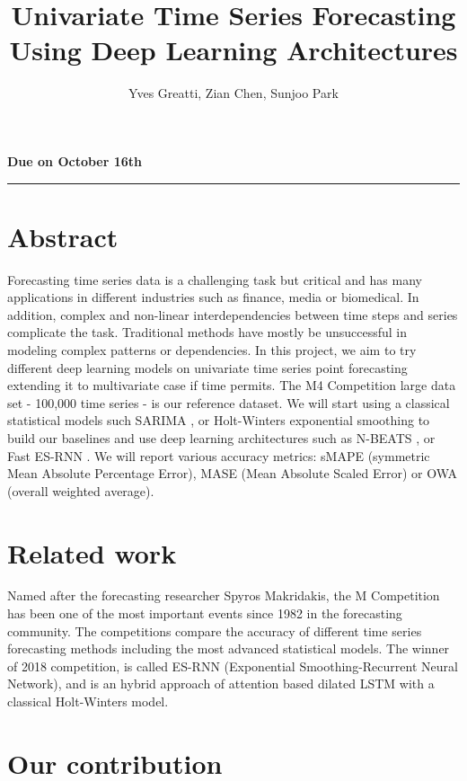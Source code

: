 \documentclass{article}
\title{Univariate Time Series Forecasting Using Deep Learning Architectures}
\author{Yves Greatti, Zian Chen, Sunjoo Park}
\date{}
\begin{document}
\maketitle
\textbf{Due on October 16th}

\noindent\rule{\textwidth}{0.4pt}


\section*{Abstract}
Forecasting time series data is a challenging task but critical and has many applications in different industries such as finance, media or biomedical.
In addition, complex and non-linear interdependencies between time steps and series complicate the task.
Traditional methods have mostly be unsuccessful in modeling complex patterns or dependencies. 
In this project, we aim to try different deep learning models on univariate time series point forecasting extending it to multivariate case if time permits.
The M4 Competition large data set - 100,000 time series - is our reference dataset. 
We will start using a classical statistical models such SARIMA , or Holt-Winters exponential smoothing to build our baselines and use deep learning architectures 
such as N-BEATS \cite{N-BEATS}, or Fast ES-RNN \cite{ES-RNN}. We will report various accuracy metrics: sMAPE (symmetric Mean Absolute Percentage Error), MASE  (Mean Absolute Scaled Error) 
or OWA (overall weighted average).

\section{Related work}
Named after the forecasting researcher Spyros Makridakis, the M Competition has been one of the most important events since 1982 in the forecasting community.
The competitions compare the accuracy of different time series forecasting methods including the most advanced statistical models. The winner of 2018 competition, is
called ES-RNN (Exponential Smoothing-Recurrent Neural Network), and is an hybrid approach of attention based dilated LSTM with a classical Holt-Winters model. 

\section{Our contribution}
\end{document}
